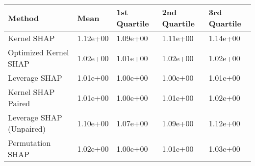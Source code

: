 \begin{tabular}{lllll}
  \toprule
  \textbf{Method} & \textbf{Mean} & \textbf{1st Quartile} & \textbf{2nd Quartile} & \textbf{3rd Quartile} \\ \midrule 
Kernel SHAP & 1.12e+00 & 1.09e+00 & 1.11e+00 & 1.14e+00\\
Optimized Kernel SHAP & \cellcolor{bronze!60}1.02e+00 & 1.01e+00 & 1.02e+00 & \cellcolor{silver!60}1.02e+00\\
Leverage SHAP & \cellcolor{gold!60}1.01e+00 & \cellcolor{gold!60}1.00e+00 & \cellcolor{gold!60}1.00e+00 & \cellcolor{gold!60}1.01e+00\\
Kernel SHAP Paired & \cellcolor{gold!60}1.01e+00 & \cellcolor{gold!60}1.00e+00 & \cellcolor{silver!60}1.01e+00 & \cellcolor{silver!60}1.02e+00\\
Leverage SHAP (Unpaired) & 1.10e+00 & 1.07e+00 & 1.09e+00 & 1.12e+00\\
Permutation SHAP & \cellcolor{bronze!60}1.02e+00 & \cellcolor{gold!60}1.00e+00 & \cellcolor{silver!60}1.01e+00 & 1.03e+00\\
\bottomrule
\end{tabular}